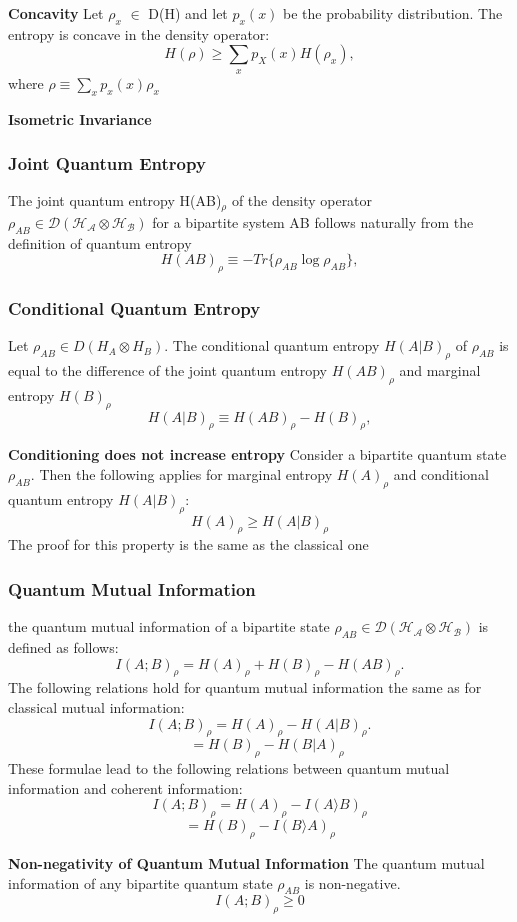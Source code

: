 \textbf{Concavity}
Let $\rho_x$ $\in$ D(H) and let $p_x(x)$ be the probability distribution. The entropy is concave in the density operator:
\[
H(\rho) \geq \sum_x p_X(x) H(\rho_x),
\]
where $\rho \equiv \sum_xp_x(x)\rho_x$

\textbf{Isometric Invariance}

\subsubsection{Joint Quantum Entropy}
The joint quantum entropy H(AB)$_\rho$ of the density operator $\rho_{AB} \in \mathcal{D}(\mathcal{H_A} \otimes \mathcal{H_B}) $ for a bipartite system AB follows naturally from the definition of quantum entropy
\[
H(AB)_\rho \equiv -Tr\{\rho_{AB} \log \rho_{AB}\},
\]


\subsubsection{Conditional Quantum Entropy}
Let $\rho_{AB} \in D(H_A \otimes H_B)$. The conditional quantum entropy $H(A|B)_\rho$ of $\rho_{AB}$ is equal to the difference of the joint quantum entropy $H(AB)_\rho$ and marginal entropy $H(B)_\rho$
\[
H(A|B)_\rho \equiv H(AB)_\rho - H(B)_\rho,
\]

\textbf{Conditioning does not increase entropy}
Consider a bipartite quantum state $\rho_{AB}$. Then the following applies for marginal entropy $H(A)_\rho$ and conditional quantum entropy $H(A|B)_\rho$:
\[
H(A)_\rho \geq H(A|B)_\rho
\]
The proof for this property is the same as the classical one


\subsubsection{Quantum Mutual Information}
the quantum mutual information of a bipartite state $\rho_{AB} \in \mathcal{D}(\mathcal{H_A} \otimes \mathcal{H_B})$ is defined as follows:
\[
I(A;B)_\rho = H(A)_\rho + H(B)_\rho - H(AB)_\rho.
\]
The following relations hold for quantum mutual information the same as for classical mutual information:
\[
I(A;B)_\rho = H(A)_\rho - H(A|B)_\rho.
\]
\[
            \quad = H(B)_\rho - H(B|A)_\rho
\]
These formulae lead to the following relations between quantum mutual information and coherent information:
\[
I(A;B)_\rho = H(A)_\rho - I(A\rangle{}B)_\rho
\]
\[
 = H(B)_\rho - I(B\rangle{}A)_\rho
\]

\textbf{Non-negativity of Quantum Mutual Information}
The quantum mutual information of any bipartite quantum state $\rho_{AB}$ is non-negative.
\[
I(A;B)_\rho \geq 0
\]


